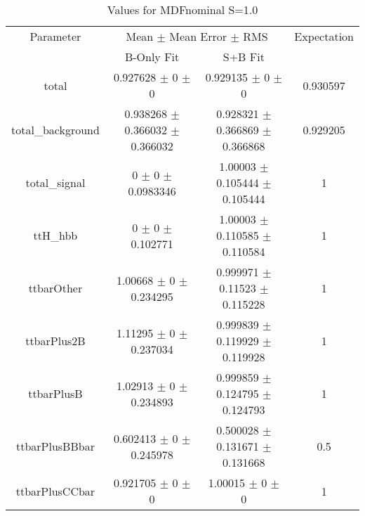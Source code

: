 \begin{table}
\centering
\caption{Values for MDFnominal S=1.0}
\begin{tabular}{cccc}
\toprule
Parameter & \multicolumn{2}{c}{Mean $\pm$ Mean Error $\pm$ RMS} & Expectation\\
 & B-Only Fit & S+B Fit & \\
\midrule
total & \num{0.927628} $\pm$ \num{0} $\pm$ \num{0} & \num{0.929135} $\pm$ \num{0} $\pm$ \num{0} & \num{0.930597}\\
total\_background & \num{0.938268} $\pm$ \num{0.366032} $\pm$ \num{0.366032} & \num{0.928321} $\pm$ \num{0.366869} $\pm$ \num{0.366868} & \num{0.929205}\\
total\_signal & \num{0} $\pm$ \num{0} $\pm$ \num{0.0983346} & \num{1.00003} $\pm$ \num{0.105444} $\pm$ \num{0.105444} & \num{1}\\
ttH\_hbb & \num{0} $\pm$ \num{0} $\pm$ \num{0.102771} & \num{1.00003} $\pm$ \num{0.110585} $\pm$ \num{0.110584} & \num{1}\\
ttbarOther & \num{1.00668} $\pm$ \num{0} $\pm$ \num{0.234295} & \num{0.999971} $\pm$ \num{0.11523} $\pm$ \num{0.115228} & \num{1}\\
ttbarPlus2B & \num{1.11295} $\pm$ \num{0} $\pm$ \num{0.237034} & \num{0.999839} $\pm$ \num{0.119929} $\pm$ \num{0.119928} & \num{1}\\
ttbarPlusB & \num{1.02913} $\pm$ \num{0} $\pm$ \num{0.234893} & \num{0.999859} $\pm$ \num{0.124795} $\pm$ \num{0.124793} & \num{1}\\
ttbarPlusBBbar & \num{0.602413} $\pm$ \num{0} $\pm$ \num{0.245978} & \num{0.500028} $\pm$ \num{0.131671} $\pm$ \num{0.131668} & \num{0.5}\\
ttbarPlusCCbar & \num{0.921705} $\pm$ \num{0} $\pm$ \num{0} & \num{1.00015} $\pm$ \num{0} $\pm$ \num{0} & \num{1}\\
\bottomrule
\end{tabular}
\end{table}